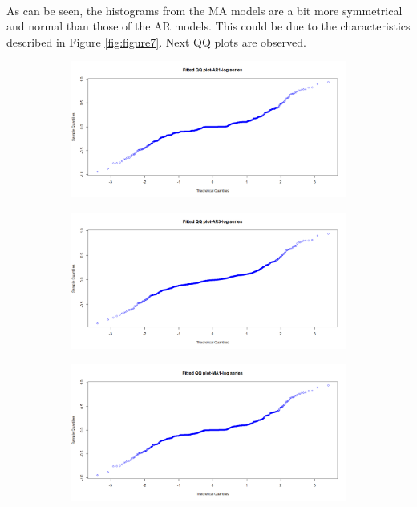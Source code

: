 \documentclass[12pt]{article}
\begin{document}
\paragraph{}
As can be seen, the histograms from the MA models are a bit more symmetrical and normal than those of the AR models. This could be due to the characteristics described in Figure \ref{fig:figure7}. Next QQ plots are observed.
\begin{figure}[H]
  \centering
  \begin{subfigure}[b]{0.49\linewidth}
    \includegraphics[width=\linewidth]{figure12-1.png}
  \end{subfigure}
  \begin{subfigure}[b]{0.49\linewidth}
    \includegraphics[width=\linewidth]{figure12-2.png}
  \end{subfigure}
  \begin{subfigure}[b]{0.49\linewidth}
    \includegraphics[width=\linewidth]{figure12-3.png}

\end{subfigure}
\end{figure}
\end{document}
